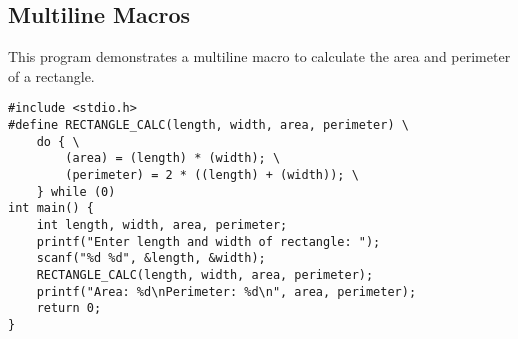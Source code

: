 \documentclass[a4paper,12pt]{article}
\begin{document}
\subsection{Multiline Macros}
This program demonstrates a multiline macro to calculate the area and perimeter of a rectangle.
\begin{lstlisting}[caption={Multiline Macros}]
#include <stdio.h>
#define RECTANGLE_CALC(length, width, area, perimeter) \
    do { \
        (area) = (length) * (width); \
        (perimeter) = 2 * ((length) + (width)); \
    } while (0)
int main() {
    int length, width, area, perimeter;
    printf("Enter length and width of rectangle: ");
    scanf("%d %d", &length, &width);
    RECTANGLE_CALC(length, width, area, perimeter);
    printf("Area: %d\nPerimeter: %d\n", area, perimeter);
    return 0;
}
\end{lstlisting}
\clearpage
\end{document}
